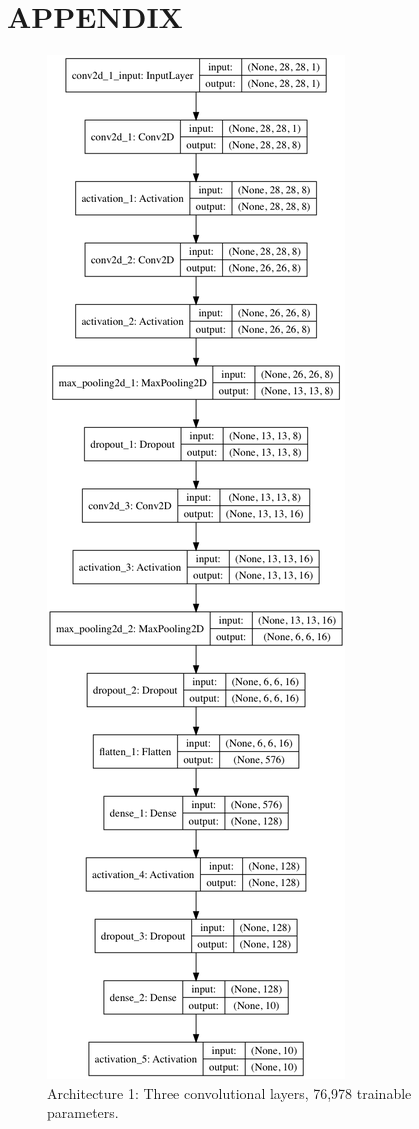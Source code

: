 \documentclass[letterpaper, 10 pt, conference]{ieeeconf}  %
\begin{document}
\section{APPENDIX}
\pagebreak
\begin{figure}
      \centering
      \includegraphics[scale = .35]{model0.png}
		\centering
      \caption{Architecture 1: Three convolutional layers, 76,978 trainable parameters.}
      \label{figurelabel}
   \end{figure}
   
\end{document}
